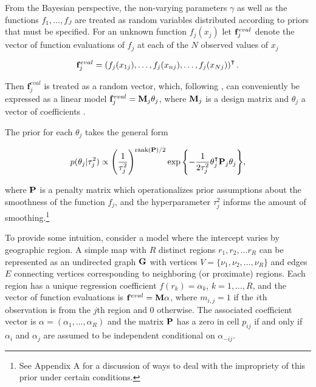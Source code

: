 From the Bayesian perspective, the non-varying parameters $\gamma$ as well as the 
functions $f_1, \dots, f_J$ are treated as random variables distributed according to priors that must 
be specified. For an unknown function $f_j(x_j)$ let $\mathbf{f}_j^{eval}$ denote the vector of function 
evaluations of $f_j$ at each of the $N$ observed values of $x_j$ 

\begin{equation*}
\mathbf{f}_j^{eval} = \left(f_j(x_{1j}), \dots, f_j(x_{nj}), \dots, f_j(x_{Nj})\right)^\intercal.  
 \end{equation*}
 
\noindent Then $\mathbf{f}_j^{eval}$ is treated as a random vector, which, following 
, can conveniently be expressed as a linear model 
$\mathbf{f}_j^{eval} = \mathbf{M}_j \theta_j$, where $\mathbf{M}_j$ is a design matrix and 
$\theta_j$ a vector of coefficients . 

The prior for each $\theta_j$  takes the general form

\begin{equation*}
p(\theta_j | \tau^2_j) 
\propto 
\left(\frac{1}{\tau_j^2} \right)^{{\rm rank}(\mathbf{P})/2}
\exp{\left\{-\frac{1}{2\tau^2_j} \theta_j^\intercal \mathbf{P}_j \theta_j\right\}},
\end{equation*}

\noindent where $\mathbf{P}$ is a penalty matrix which operationalizes prior assumptions 
about the smoothness of the function $f_j$, and the hyperparameter $\tau^2_j$
informs the amount of smoothing.\footnote{See Appendix A%
for a discussion of ways to deal with the impropriety of this prior under certain conditions.}

To provide some intuition, consider a model where the intercept varies by geographic region. 
A simple map with $R$ distinct regions $r_1, r_2, \dots r_R$ can be represented as an undirected graph 
$\mathbf{G}$ with vertices $V = \{\nu_1, \nu_2, \dots, \nu_R\}$ and edges $E$ connecting vertices corresponding 
to neighboring (or proximate) regions. Each region has a unique regression coefficient $f(r_k) = \alpha_k$,
$k = 1, \dots, R$, and the vector of function evaluations is $\mathbf{f}^{eval} = \mathbf{M} \alpha$,
where $m_{i,j} = 1$ if the $i$th observation is from the $j$th region and 0 otherwise. The associated 
coefficient vector is $\alpha = (\alpha_1, \dots, \alpha_R)$ and the matrix $\mathbf{P}$ has a zero in  
cell $p_{ij}$ if and only if $\alpha_i$ and $\alpha_j$ are assumed to be independent conditional on 
$\alpha_{-ij}$. 

